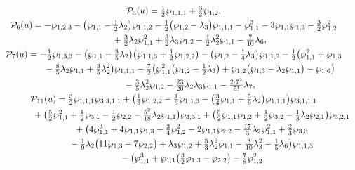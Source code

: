 \documentclass[pdftex]{sigma}
\numberwithin{equation}{section}
\begin{document}
\begin{gather*}
\mathcal{P}_3(u) = \tfrac{1}{2} \wp _{1,1,1} + \tfrac{3}{2} \wp_{1,2}, \\
\mathcal{P}_6(u) = - \wp_{1,2,3} - \big(\wp _{1,1}- \tfrac{1}{2} \lambda_2 \big) \wp_{1,1,2} - \tfrac{1}{2} \big(\wp _{1,2}- \lambda_3\big) \wp_{1,1,1} - \wp_{1,1}^3 - 3 \wp_{1,1} \wp_{1,3} - \tfrac{3}{2} \wp_{1,2}^2\\
 \hphantom{\mathcal{P}_6(u) =}{} + \tfrac{3}{2}\lambda_2 \wp_{1,1}^2 + \tfrac{3}{2} \lambda_3 \wp_{1,2} - \tfrac{1}{2} \lambda_2^2 \wp_{1,1} - \tfrac{7}{10}\lambda_6, \\
\mathcal{P}_7(u) = -\tfrac{1}{2}\wp_{1,3,3} - \big(\wp_{1,1}- \tfrac{3}{5}\lambda_2\big) \big(\wp _{1,1,3} + \tfrac{1}{2}\wp _{1,2,2} \big)- \big(\wp_{1,2} - \tfrac{1}{4} \lambda_3\big)\wp _{1,1,2}- \tfrac{1}{2}\big(\wp_{1,1}^2 + \wp_{1,3} \\
\hphantom{\mathcal{P}_7(u) =}{} - \tfrac{8}{5}\lambda_2\wp_{1,1} + \tfrac{3}{5}\lambda_2^2\big) \wp _{1,1,1}- \tfrac{7}{2} \big(\wp_{1,1}^2 \big(\wp_{1,2} - \tfrac{1}{2} \lambda_3\big) + \wp_{1,2} \big(\wp_{1,3}-\lambda_2\wp_{1,1}\big) - \wp_{1,6} \big) \\
\hphantom{\mathcal{P}_7(u) =}{}- \tfrac{3}{5} \lambda_2^2 \wp_{1,2}- \tfrac{23}{20} \lambda_2 \lambda_3 \wp_{1,1} - \tfrac{2\cdot 7^2}{5!} \lambda_7,\\
\mathcal{P}_{11}(u) = \tfrac{3}{2} \wp_{1,1,1} \wp _{3,3,1,1} + \big(\tfrac{1}{3} \wp_{1,2,2} - \tfrac{1}{6}\wp_{1,1,3} - \big(\tfrac{3}{4}\wp_{1,1} + \tfrac{5}{9}\lambda_2\big) \wp_{1,1,1} \big) \wp _{3,1,1,1}\\
\hphantom{\mathcal{P}_{11}(u) =}{} + \big(\tfrac{5}{2}\wp_{1,1}^2 + \tfrac{1}{2} \wp_{3,1} - \tfrac{1}{2} \wp_{2,2} - \tfrac{5^2}{18}\lambda_2 \wp_{1,1}\big) \wp_{3,3,1}
 + \big(\tfrac{5}{2} \wp_{1,1} \wp_{1,2} + \tfrac{1}{2} \wp_{3,2} - \tfrac{1}{3} \lambda_2 \wp_{2,1} \big) \wp_{3,2,1}\\
\hphantom{\mathcal{P}_{11}(u) =}{}
 + \big(4\wp_{1,1}^3 + 4 \wp_{1,1} \wp_{1,3} - \tfrac{3}{4} \wp_{1,2}^2 - 2 \wp_{1,1} \wp_{2,2} - \tfrac{17}{3} \lambda_2 \wp_{1,1}^2 + \tfrac{2}{3} \wp_{3,3}\\
\hphantom{\mathcal{P}_{11}(u) =}{}
 - \tfrac{1}{9}\lambda_2 \big(11 \wp_{1,3} - 7 \wp_{2,2}\big) + \lambda_3 \wp_{1,2}
 + \tfrac{5}{3} \lambda_2^2 \wp_{1,1} - \tfrac{3}{10} \lambda_3^2 - \tfrac{1}{5} \lambda_6\big) \wp_{1,1,3} \\
\hphantom{\mathcal{P}_{11}(u) =}{}
 - \big(\wp_{1,1}^3 + \wp_{1,1} \big(\tfrac{3}{2} \wp_{1,3} - \wp_{2,2}\big) - \tfrac{7}{8} \wp_{1,2}^2

\end{gather*}
\end{document}
